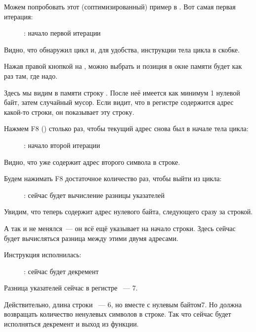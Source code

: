 ﻿\clearpage
{}
\myindex{\olly}

Можем попробовать этот (соптимизированный) пример в \olly.  Вот самая первая итерация:

\begin{figure}[H]
\centering
{}
\caption{\olly: начало первой итерации}
\label{fig:strlen_olly_1}
\end{figure}

Видно, что \olly обнаружил цикл и, для удобства,  инструкции тела цикла в скобке.

Нажав правой кнопкой на \EAX, можно выбрать  
и позиция в окне памяти будет как раз там, где надо.

Здесь мы видим в памяти строку .
После неё имеется как минимум 1 нулевой байт, затем случайный мусор.
Если \olly видит, что в регистре содержится адрес какой-то строки, он показывает эту строку.

\clearpage
Нажмем F8 (\stepover) столько раз, чтобы текущий адрес снова был в начале тела цикла:

\begin{figure}[H]
\centering
{}
\caption{\olly: начало второй итерации}
\label{fig:strlen_olly_2}
\end{figure}

Видно, что \EAX уже содержит адрес второго символа в строке.

\clearpage
Будем нажимать F8 достаточное количество раз, чтобы выйти из цикла:

\begin{figure}[H]
\centering
{}
\caption{\olly: сейчас будет вычисление разницы указателей}
\label{fig:strlen_olly_3}
\end{figure}

Увидим, что \EAX теперь содержит адрес нулевого байта, следующего сразу за строкой.

А \EDX так и не менялся~--- он всё ещё указывает на начало строки.
Здесь сейчас будет вычисляться разница между этими двумя адресами.

\clearpage
Инструкция \SUB исполнилась:

\begin{figure}[H]
\centering
{}
\caption{\olly: сейчас будет декремент \EAX}
\label{fig:strlen_olly_4}
\end{figure}

Разница указателей сейчас в регистре \EAX~--- 7.

Действительно, длина строки ~--- 6, 
но вместе с нулевым байтом\EMDASH{}7.
Но  должна возвращать количество ненулевых символов в строке.
Так что сейчас будет исполняться декремент и выход из функции.

